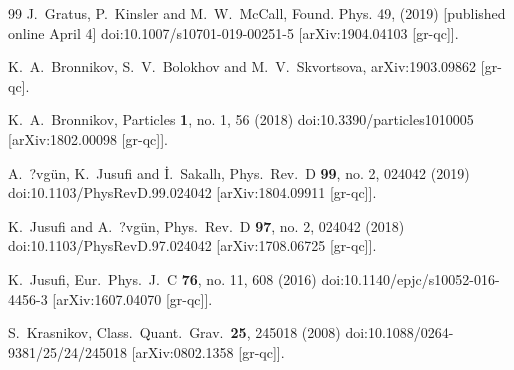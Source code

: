 \documentclass[prd, amsfonts, twocolumn, nofootinbib, showpacs]{revtex4}
\begin{document}
\begin{thebibliography}{99}
  J.~Gratus, P.~Kinsler and M.~W.~McCall,
  Found. Phys. 49, (2019) [published online April 4]
  doi:10.1007/s10701-019-00251-5
  [arXiv:1904.04103 [gr-qc]].


  K.~A.~Bronnikov, S.~V.~Bolokhov and M.~V.~Skvortsova,
  arXiv:1903.09862 [gr-qc].

  K.~A.~Bronnikov,
  Particles {\bf 1}, no. 1, 56 (2018)
  doi:10.3390/particles1010005
  [arXiv:1802.00098 [gr-qc]].

  A.~?vgün, K.~Jusufi and İ.~Sakallı,
  Phys.\ Rev.\ D {\bf 99}, no. 2, 024042 (2019)
  doi:10.1103/PhysRevD.99.024042
  [arXiv:1804.09911 [gr-qc]].

  K.~Jusufi and A.~?vgün,
  Phys.\ Rev.\ D {\bf 97}, no. 2, 024042 (2018)
  doi:10.1103/PhysRevD.97.024042
  [arXiv:1708.06725 [gr-qc]].

  K.~Jusufi,
  Eur.\ Phys.\ J.\ C {\bf 76}, no. 11, 608 (2016)
  doi:10.1140/epjc/s10052-016-4456-3
  [arXiv:1607.04070 [gr-qc]].


  S.~Krasnikov,
  Class.\ Quant.\ Grav.\  {\bf 25}, 245018 (2008)
  doi:10.1088/0264-9381/25/24/245018
  [arXiv:0802.1358 [gr-qc]].


\end{thebibliography}
\end{document}

